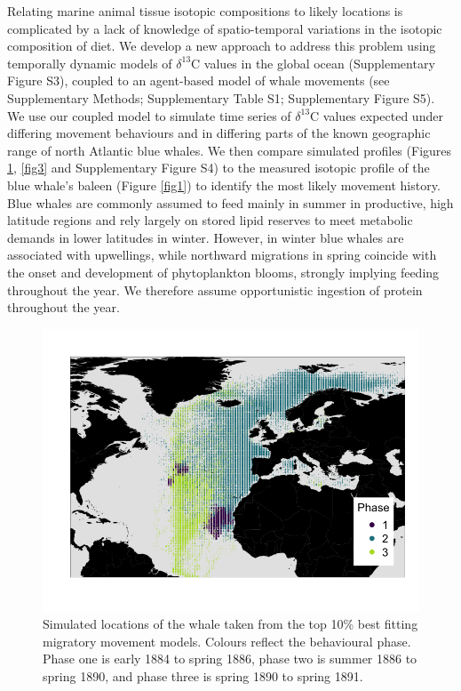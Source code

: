 \documentclass[a4paper,12pt]{article}
\begin{document}
Relating marine animal tissue isotopic compositions to likely locations is complicated by a lack of knowledge of spatio-temporal variations in the isotopic composition of diet\cite{west2006stable,mcmahon2015millennial}.
We develop a new approach to address this problem using temporally dynamic models of $\delta^{13}$C values in the global ocean\cite{magozzi2017using} (Supplementary Figure S3), coupled to an agent-based model of whale movements (see Supplementary Methods; Supplementary Table S1; Supplementary Figure S5).  
We use our coupled model to simulate time series of $\delta^{13}$C values expected under differing movement behaviours and in differing parts of the known geographic range of north Atlantic blue whales. 
We then compare simulated profiles (Figures \ref{fig2}, \ref{fig3} and Supplementary Figure S4) to the measured isotopic profile of the blue whale's baleen (Figure \ref{fig1}) to identify the most likely movement history. 
Blue whales are commonly assumed to feed mainly in summer in productive, high latitude regions and rely largely on stored lipid reserves to meet metabolic demands in lower latitudes in winter. 
However, in winter blue whales are associated with upwellings\cite{baines2017autumn}, while northward migrations in spring coincide with the onset and development of phytoplankton blooms\cite{silva2013north,visser2011timing,busquets2017estimating}, strongly implying feeding throughout the year. 
We therefore assume opportunistic ingestion of protein throughout the year. 

\begin{figure}
 \centering
 \includegraphics[width = \linewidth]{figures/Figure-2-points.png}
  \caption{Simulated locations of the whale taken from the top 10\% best fitting migratory movement models. 
  Colours reflect the behavioural phase. 
  Phase one is early 1884 to spring 1886, phase two is summer 1886 to spring 1890, and phase three is spring 1890 to spring 1891.}
  \label{fig2}
\end{figure}
\end{document}
